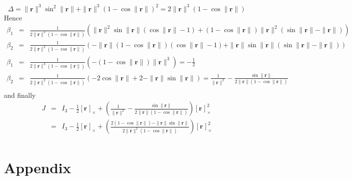 \documentclass {article}
\newcommand\rot{\mathbf{r}}
\newcommand\rcross[1]{[\rot_{#1}]_{\times}}
\newcommand\normr{\|\rot\|}
\begin{document}
$$
\Delta = \normr^3\sin^2\normr + \normr^3 (1-\cos\normr)^2 = 2\normr^3(1 -\cos\normr)
$$
Hence
\begin{eqnarray*}
\beta_1 &=& \frac{1}{2\normr^3(1 -\cos\normr)}\left(\normr^2\sin\normr (\cos \normr - 1) + (1 - \cos \normr)\normr^2(\sin\normr - \normr)\right) \\
\beta_2 &=& \frac{1}{2\normr^3(1 -\cos\normr)}\left(-\normr(1 - \cos \normr)(\cos \normr - 1) + \normr\sin\normr(\sin\normr - \normr)\right)\\
\beta_1 &=& \frac{1}{2\normr^3(1 -\cos\normr)}\left(-(1 - \cos \normr)\normr^3\right) = -\frac{1}{2}\\
\beta_2 &=& \frac{1}{2\normr^2(1 -\cos\normr)}\left(-2\cos \normr + 2 - \normr\sin\normr\right) = \frac{1}{\normr^2} - \frac{\sin\normr}{2\normr(1-\cos\normr)}\\
\end{eqnarray*}
and finally
\begin{eqnarray*}
J &=& I_3 -\frac{1}{2}\rcross{} +  \left(\frac{1}{\normr^2} - \frac{\sin\normr}{2\normr(1-\cos\normr)}\right)\rcross{}^2\\
&=& I_3 -\frac{1}{2}\rcross{} +  \left(\frac{2(1-\cos\normr) - \normr\sin\normr}{2\normr^2(1-\cos\normr)}\right)\rcross{}^2\\
\end{eqnarray*}


\section{Appendix}
\end{document}
